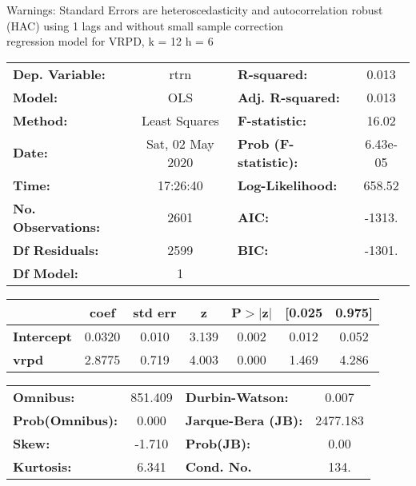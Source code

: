 Warnings: \newline
 [1] Standard Errors are heteroscedasticity and autocorrelation robust (HAC) using 1 lags and without small sample correction\\ 

regression model for VRPD, k = 12 h = 6\begin{center}
\begin{tabular}{lclc}
\toprule
\textbf{Dep. Variable:}    &       rtrn       & \textbf{  R-squared:         } &     0.013   \\
\textbf{Model:}            &       OLS        & \textbf{  Adj. R-squared:    } &     0.013   \\
\textbf{Method:}           &  Least Squares   & \textbf{  F-statistic:       } &     16.02   \\
\textbf{Date:}             & Sat, 02 May 2020 & \textbf{  Prob (F-statistic):} &  6.43e-05   \\
\textbf{Time:}             &     17:26:40     & \textbf{  Log-Likelihood:    } &    658.52   \\
\textbf{No. Observations:} &        2601      & \textbf{  AIC:               } &    -1313.   \\
\textbf{Df Residuals:}     &        2599      & \textbf{  BIC:               } &    -1301.   \\
\textbf{Df Model:}         &           1      & \textbf{                     } &             \\
\bottomrule
\end{tabular}
\begin{tabular}{lcccccc}
                   & \textbf{coef} & \textbf{std err} & \textbf{z} & \textbf{P$> |$z$|$} & \textbf{[0.025} & \textbf{0.975]}  \\
\midrule
\textbf{Intercept} &       0.0320  &        0.010     &     3.139  &         0.002        &        0.012    &        0.052     \\
\textbf{vrpd}      &       2.8775  &        0.719     &     4.003  &         0.000        &        1.469    &        4.286     \\
\bottomrule
\end{tabular}
\begin{tabular}{lclc}
\textbf{Omnibus:}       & 851.409 & \textbf{  Durbin-Watson:     } &    0.007  \\
\textbf{Prob(Omnibus):} &   0.000 & \textbf{  Jarque-Bera (JB):  } & 2477.183  \\
\textbf{Skew:}          &  -1.710 & \textbf{  Prob(JB):          } &     0.00  \\
\textbf{Kurtosis:}      &   6.341 & \textbf{  Cond. No.          } &     134.  \\
\bottomrule
\end{tabular}
\end{center}

